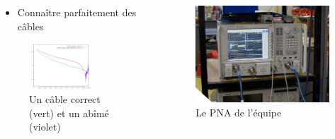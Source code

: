 \documentclass[10pt,a9paper,handout]{beamer} \usepackage[utf8]{inputenc} \usepackage[francais]{babel} \usepackage[T1]{fontenc}
\begin{document}
\begin{frame}
\begin{columns}
\begin{column}{0.6\textwidth}
\begin{itemize}
        \item Connaître parfaitement des câbles
    \end{itemize}
    \vspace*{5mm}
    \begin{figure}[h]
    \begin{center}
        \includegraphics[width=0.65\textwidth]{Images/Caracs/abime2.png}
        \caption{Un câble correct (vert) et un abîmé (violet)}
        \label{Carac1}
    \end{center}
\end{figure}
\end{column}
\begin{column}{0.4\textwidth}
\begin{figure}[h]
    \begin{center}
        \includegraphics[width=\textwidth]{Images/VNA}
        \caption{Le PNA de l’équipe}
    \end{center}
\end{figure}
\end{column}
\end{columns}
\end{frame}
\end{document}

